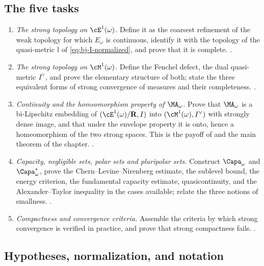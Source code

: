 \subsection{The five tasks}
\label{sec:ch48-tasks}

\begin{enumerate}
\item\label{itm:ch48-task:potentials}
      \emph{The strong topology on $\cE^1(\omega)$.}  Define it as the
      coarsest refinement of the weak topology for which $E_\omega$ is
      continuous, identify it with the topology of the quasi-metric
      $\mathbb I$ of \eqref{eq:bj-I-normalized}, and prove that it is
      complete.  .
\item\label{itm:ch48-task:measures}
      \emph{The strong topology on $\cM^1(\omega)$.}  Define the Fenchel
      defect, the dual quasi-metric $I^\vee$, and prove the elementary
      structure of both; state the three equivalent forms of strong
      convergence of measures and their completeness.
      .
\item\label{itm:ch48-task:ma}
      \emph{Continuity and the homeomorphism property of
      $\MA_\omega$.}  Prove that $\MA_\omega$ is a bi-Lipschitz
      embedding of $(\cE^1(\omega)/\mathbf R,I)$ into
      $(\cM^1(\omega),I^\vee)$ with strongly dense image, and that under
      the envelope property it is onto, hence a homeomorphism of the two
      strong spaces.  This is the payoff of
       and the main theorem of
      the chapter.  .
\item\label{itm:ch48-task:capacity}
      \emph{Capacity, negligible sets, polar sets and pluripolar sets.}
      Construct $\Capa_\omega$ and $\Capa^*_\omega$, prove the
      Chern--Levine--Nirenberg estimate, the sublevel bound, the energy
      criterion, the fundamental capacity estimate, quasicontinuity, and
      the Alexander--Taylor inequality in the cases available; relate the
      three notions of smallness.
      .
\item\label{itm:ch48-task:compactness}
      \emph{Compactness and convergence criteria.}  Assemble the criteria
      by which strong convergence is verified in practice, and prove that
      strong compactness fails.  .
\end{enumerate}

\subsection{Hypotheses, normalization, and notation}
\label{sec:ch48-hypotheses}


